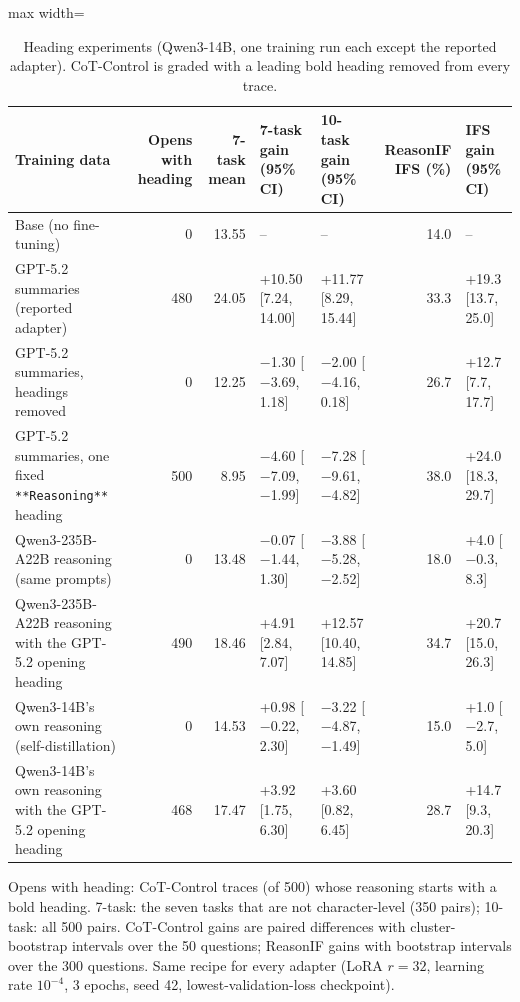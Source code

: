 \begin{table}[t]
\centering\small
\caption{Heading experiments (Qwen3-14B, one training run each except the reported adapter). CoT-Control is graded with a leading bold heading removed from every trace.}\label{tab:headings}
\setlength{\tabcolsep}{4pt}
\begin{adjustbox}{max width=\linewidth}
\begin{tabular}{lrrllrl}
\toprule
Training data & Opens with heading & 7-task mean & 7-task gain (95\% CI) & 10-task gain (95\% CI) & ReasonIF IFS (\%) & IFS gain (95\% CI) \\
\midrule
Base (no fine-tuning) & 0 & 13.55 & -- & -- & 14.0 & -- \\
GPT-5.2 summaries (reported adapter) & 480 & 24.05 & +10.50 [7.24, 14.00] & +11.77 [8.29, 15.44] & 33.3 & +19.3 [13.7, 25.0] \\
GPT-5.2 summaries, headings removed & 0 & 12.25 & $-$1.30 [$-$3.69, 1.18] & $-$2.00 [$-$4.16, 0.18] & 26.7 & +12.7 [7.7, 17.7] \\
GPT-5.2 summaries, one fixed \texttt{**Reasoning**} heading & 500 & 8.95 & $-$4.60 [$-$7.09, $-$1.99] & $-$7.28 [$-$9.61, $-$4.82] & 38.0 & +24.0 [18.3, 29.7] \\
Qwen3-235B-A22B reasoning (same prompts) & 0 & 13.48 & $-$0.07 [$-$1.44, 1.30] & $-$3.88 [$-$5.28, $-$2.52] & 18.0 & +4.0 [$-$0.3, 8.3] \\
Qwen3-235B-A22B reasoning with the GPT-5.2 opening heading & 490 & 18.46 & +4.91 [2.84, 7.07] & +12.57 [10.40, 14.85] & 34.7 & +20.7 [15.0, 26.3] \\
Qwen3-14B's own reasoning (self-distillation) & 0 & 14.53 & +0.98 [$-$0.22, 2.30] & $-$3.22 [$-$4.87, $-$1.49] & 15.0 & +1.0 [$-$2.7, 5.0] \\
Qwen3-14B's own reasoning with the GPT-5.2 opening heading & 468 & 17.47 & +3.92 [1.75, 6.30] & +3.60 [0.82, 6.45] & 28.7 & +14.7 [9.3, 20.3] \\
\bottomrule
\end{tabular}
\end{adjustbox}
\par\smallskip\begin{minipage}{0.97\linewidth}\footnotesize Opens with heading: CoT-Control traces (of 500) whose reasoning starts with a bold heading. 7-task: the seven tasks that are not character-level (350 pairs); 10-task: all 500 pairs. CoT-Control gains are paired differences with cluster-bootstrap intervals over the 50 questions; ReasonIF gains with bootstrap intervals over the 300 questions. Same recipe for every adapter (LoRA $r=32$, learning rate $10^{-4}$, 3 epochs, seed 42, lowest-validation-loss checkpoint).\end{minipage}
\end{table}
